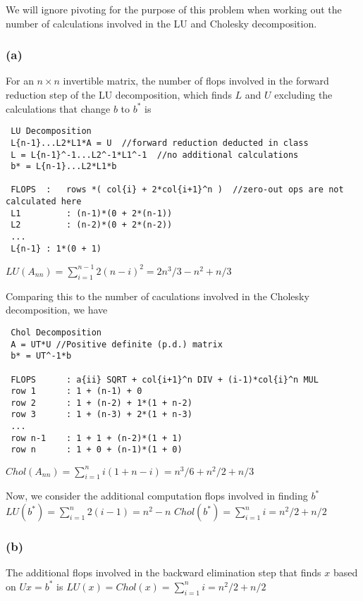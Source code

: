 \documentclass{article}\usepackage{graphicx, color}
\begin{document}
We will ignore pivoting for the purpose of this problem when working out the number of calculations 
involved in the LU and Cholesky decomposition. 

\subsubsection*{(a)}
For an $n\times n$ invertible matrix, the number of flops involved in the forward reduction step of
the LU decomposition, which finds $L$ and $U$ excluding the calculations that change $b$ to $b^*$ is
\begin{lstlisting}
 LU Decomposition
 L{n-1}...L2*L1*A = U  //forward reduction deducted in class
 L = L{n-1}^-1...L2^-1*L1^-1  //no additional calculations
 b* = L{n-1}...L2*L1*b

 FLOPS	:	rows *( col{i} + 2*col{i+1}^n )  //zero-out ops are not calculated here
 L1			: (n-1)*(0 + 2*(n-1))
 L2			: (n-2)*(0 + 2*(n-2))
 ...
 L{n-1}	: 1*(0 + 1)
\end{lstlisting}
$LU(A_{nn}) = \sum_{i=1}^{n-1} 2(n-i)^2 = 2n^3/3 - n^2 + n/3$

\hbox{}
Comparing this to the number of caculations involved in the Cholesky decomposition, we have
\begin{lstlisting}
 Chol Decomposition
 A = UT*U //Positive definite (p.d.) matrix
 b* = UT^-1*b

 FLOPS		: a{ii} SQRT + col{i+1}^n DIV + (i-1)*col{i}^n MUL
 row 1		: 1 + (n-1) + 0
 row 2		: 1 + (n-2) + 1*(1 + n-2)
 row 3		: 1 + (n-3) + 2*(1 + n-3)
 ...
 row n-1	: 1 + 1 + (n-2)*(1 + 1)
 row n		: 1 + 0 + (n-1)*(1 + 0)
\end{lstlisting}
$Chol(A_{nn}) = \sum_{i=1}^n i(1 + n-i) = n^3/6 + n^2/2 + n/3$ 

\hbox{}
Now, we consider the additional computation flops involved in finding $b^*$
\newline
\hbox{}
\newline
$LU(b^*)  = \sum_{i=1}^n 2(i-1) = n^2 - n$
\newline
$Chol(b^*)  = \sum_{i=1}^n i  = n^2/2 + n/2$


\subsubsection*{(b)}
The additional flops involved in the backward elimination step that finds $x$ based on
$Ux=b^*$ is \newline
$LU(x) = Chol(x) = \sum_{i=1}^n i  = n^2/2 + n/2$
\end{document}
